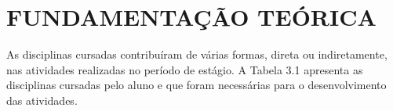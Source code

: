 \documentclass[
  12pt,				%
  openany,
  oneside,
  a4paper,			%
  english,			%
  brazil
]{article}
\numberwithin{figure}{section}
\numberwithin{table}{section}
\begin{document}




\section{FUNDAMENTAÇÃO TEÓRICA}



As disciplinas cursadas contribuíram de várias formas, direta ou indiretamente, nas atividades realizadas no período de estágio. A Tabela 3.1 apresenta as disciplinas cursadas pelo aluno e que foram necessárias para o desenvolvimento das atividades.
\end{document}
